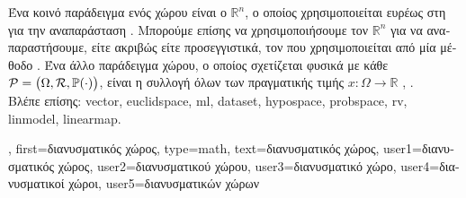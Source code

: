 {{\begin{figure}[H]
{			%
			\label{fig:vector-ops_dict} }
		\end{figure}
		\foreignlanguage{greek}{Ένα κοινό παράδειγμα ενός}  \foreignlanguage{greek}{χώρου είναι ο} 
		 $\mathbb{R}^n$, \foreignlanguage{greek}{ο οποίος χρησιμοποιείται ευρέως στη} 
		 \foreignlanguage{greek}{για την αναπαράσταση} . 
		\foreignlanguage{greek}{Μπορούμε επίσης να χρησιμοποιήσουμε τον $\mathbb{R}^n$ για να αναπαραστήσουμε,
		είτε ακριβώς είτε προσεγγιστικά, τον}  \foreignlanguage{greek}{που χρησιμοποιείται
		από μία μέθοδο} . \foreignlanguage{greek}{Ένα άλλο παράδειγμα}  
		\foreignlanguage{greek}{χώρου, ο οποίος σχετίζεται φυσικά με κάθε}  
		$\mathcal{P}=\big(\Omega,\mathcal{R},\mathbb{P}({\cdot}) \big)$, \foreignlanguage{greek}{είναι η συλλογή όλων των} 
		 \foreignlanguage{greek}{πραγματικής τιμής} $x: \Omega \rightarrow \mathbb{R}$ \cite{RudinBook}, \cite{folland1999real}. \\
		\foreignlanguage{greek}{Βλέπε επίσης:} \gls{vector}, \gls{euclidspace}, \gls{ml}, \gls{dataset}, \gls{hypospace}, \gls{probspace},  
		\gls{rv}, \gls{linmodel}, \gls{linearmap}.},
	first={\foreignlanguage{greek}{διανυσματικός χώρος}},
	type=math,
	text={\foreignlanguage{greek}{διανυσματικός χώρος}},
	user1={\foreignlanguage{greek}{διανυσματικός χώρος}}, %
	user2={\foreignlanguage{greek}{διανυσματικού χώρου}}, %
	user3={\foreignlanguage{greek}{διανυσματικό χώρο}}, %
	user4={\foreignlanguage{greek}{διανυσματικοί χώροι}}, %
	user5={\foreignlanguage{greek}{διανυσματικών χώρων}} %
}


